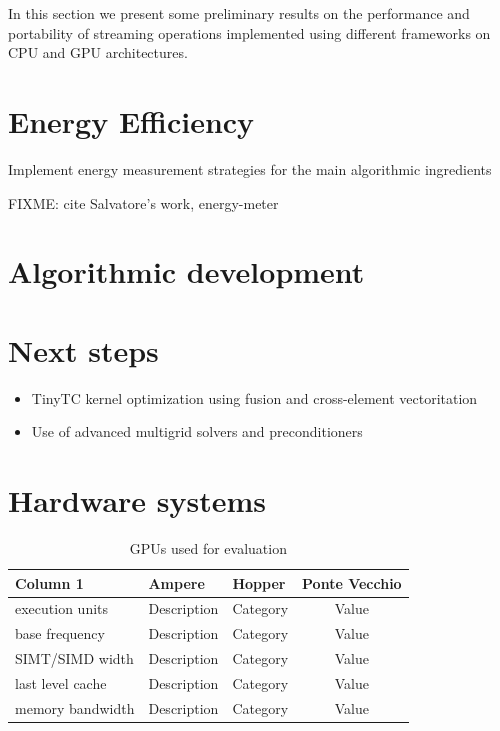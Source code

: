 \documentclass[a4paper,12pt]{article}
\begin{document}
In this section we present some preliminary results on the performance and portability of
streaming operations implemented using different frameworks on CPU and GPU architectures.



\section{Energy Efficiency}

Implement energy measurement strategies for the main algorithmic ingredients

FIXME: cite Salvatore's work, energy-meter 

\section{Algorithmic development}


\section{Next steps}

\begin{itemize}
    \item TinyTC kernel optimization using fusion and cross-element vectoritation
    \item Use of advanced multigrid solvers and preconditioners
\end{itemize}


\section{Hardware systems}

\begin{center}
    \begin{table}[h!]
    \small
    \caption{GPUs used for evaluation}
    \renewcommand{\arraystretch}{1.25}
    \label{tab:example_table}
    \begin{tabular}{|l|l|l|c|}
    \hline
    \textbf{Column 1} & \textbf{Ampere} & \textbf{Hopper} & \textbf{Ponte Vecchio} \\
    \hline
    execution units & Description & Category & Value \\
    base frequency & Description & Category & Value \\
    SIMT/SIMD width & Description & Category & Value \\
    last level cache & Description & Category & Value \\
    memory bandwidth & Description & Category & Value \\
    \hline
    \end{tabular}
    \end{table}
\end{center}



\label{MyLastPage}
\end{document}
